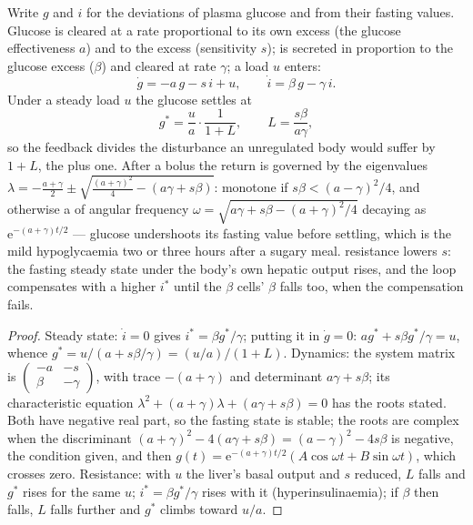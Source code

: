 \begin{theorem}\label{thm:b3:endocrinology:loop}
Write $g$ and $i$ for the deviations of plasma glucose and  from
their fasting values. Glucose is cleared at a rate proportional to its
own excess (the glucose effectiveness $a$) and to the  excess
(sensitivity $s$);  is secreted in proportion to the glucose
excess ($\beta$) and cleared at rate $\gamma$; a load $u$ enters:
\[
\dot g = -a\,g - s\,i + u, \qquad \dot i = \beta\,g - \gamma\,i .
\]
Under a steady load $u$ the glucose settles at
\[
g^{*} = \frac{u}{a}\cdot\frac{1}{1 + L}, \qquad L = \frac{s\beta}{a\gamma},
\]
so the feedback divides the disturbance an unregulated body would
suffer by $1 + L$, the \emph{} plus one. After a bolus the
return is governed by the eigenvalues
$\lambda = -\tfrac{a + \gamma}{2} \pm \sqrt{\tfrac{(a+\gamma)^{2}}{4} - (a\gamma + s\beta)}$:
monotone if $s\beta < (a - \gamma)^{2}/4$, and otherwise a  of angular frequency $\omega = \sqrt{a\gamma + s\beta -
(a+\gamma)^{2}/4}$ decaying as $\mathrm{e}^{-(a+\gamma)t/2}$ --- glucose
undershoots its fasting value before settling, which is the mild
hypoglycaemia two or three hours after a sugary meal. 
resistance lowers $s$: the fasting steady state under the body's own
hepatic output rises, and the loop compensates with a higher $i^{*}$
until the $\beta$ cells' $\beta$ falls too, when the compensation fails.
\end{theorem}
\begin{proof}
Steady state: $\dot i = 0$ gives $i^{*} = \beta g^{*}/\gamma$; putting
it in $\dot g = 0$: $a g^{*} + s\beta g^{*}/\gamma = u$, whence $g^{*} =
u/(a + s\beta/\gamma) = (u/a)/(1 + L)$. Dynamics: the system matrix is
$\begin{pmatrix} -a & -s\\ \beta & -\gamma\end{pmatrix}$, with trace
$-(a+\gamma)$ and determinant $a\gamma + s\beta$; its characteristic
equation $\lambda^{2} + (a+\gamma)\lambda + (a\gamma + s\beta) = 0$ has
the roots stated. Both have negative real part, so the fasting state
is stable; the roots are complex when the discriminant $(a+\gamma)^{2}
- 4(a\gamma + s\beta) = (a-\gamma)^{2} - 4s\beta$ is negative, the
condition given, and then $g(t) = \mathrm{e}^{-(a+\gamma)t/2}(A\cos\omega t
+ B\sin\omega t)$, which crosses zero. Resistance: with $u$ the liver's
basal output and $s$ reduced, $L$ falls and $g^{*}$ rises for the same
$u$; $i^{*} = \beta g^{*}/\gamma$ rises with it (hyperinsulinaemia);
if $\beta$ then falls, $L$ falls further and $g^{*}$ climbs toward $u/a$.
\end{proof}

